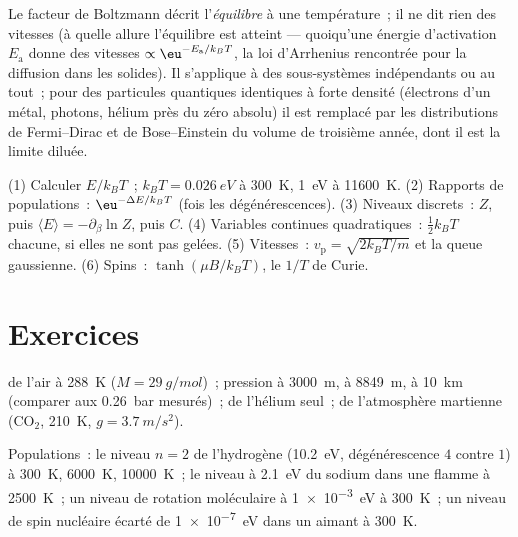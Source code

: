 \begin{remark}\label{rem:b2:boltzmann-factor:limits}
Le facteur de Boltzmann décrit l'\emph{équilibre} à une température~; il
ne dit rien des vitesses (à quelle allure l'équilibre est atteint ---
quoiqu'une énergie d'activation $E_{\text{a}}$ donne des vitesses $\propto\eu^{-E_{\text{a}}/k_BT}$,
la loi d'Arrhenius rencontrée pour la diffusion dans les solides). Il s'applique à des
sous-systèmes indépendants ou au tout~; pour des particules quantiques
identiques à forte densité (électrons d'un métal, photons, hélium près du
zéro absolu) il est remplacé par les distributions de Fermi--Dirac et de Bose--Einstein
du volume de troisième année, dont il est la limite diluée.
\end{remark}

\begin{method}\label{meth:b2:boltzmann-factor:method}
(1) Calculer $E/k_BT$~; $k_BT = \qty{0.026}{eV}$ à \qty{300}{K}, \qty{1}{eV}
à \qty{11600}{K}. (2) Rapports de populations~: $\eu^{-\Delta E/k_BT}$ (fois les
dégénérescences). (3) Niveaux discrets~: $Z$, puis $\langle E\rangle =
-\partial_\beta\ln Z$, puis $C$. (4) Variables continues quadratiques~:
$\tfrac12k_BT$ chacune, si elles ne sont pas gelées. (5) Vitesses~: $v_{\text{p}} = \sqrt{2k_BT/m}$
et la queue gaussienne. (6) Spins~: $\tanh(\mu B/k_BT)$, le $1/T$ de Curie.
\end{method}

\section{Exercices}

\begin{exercise}[$\star$]\label{exo:b2:boltzmann-factor:1}
 de l'air à \qty{288}{K} ($M = \qty{29}{g/mol}$)~; pression à
\qty{3000}{m}, à \qty{8849}{m}, à \qty{10}{km} (comparer aux \qty{0.26}{bar}
mesurés)~;  de l'hélium seul~; de l'atmosphère martienne
(CO$_2$, \qty{210}{K}, $g = \qty{3.7}{m/s^2}$).
\end{exercise}

\begin{exercise}[$\star$]\label{exo:b2:boltzmann-factor:2}
Populations~: le niveau $n = 2$ de l'hydrogène (\qty{10.2}{eV}, dégénérescence $4$
contre $1$) à \qty{300}{K}, \qty{6000}{K}, \qty{10000}{K}~; le niveau à
\qty{2.1}{eV} du sodium dans une flamme à \qty{2500}{K}~; un niveau de rotation moléculaire à
\qty{1e-3}{eV} à \qty{300}{K}~; un niveau de spin nucléaire écarté de \qty{1e-7}{eV} dans
un aimant à \qty{300}{K}.
\end{exercise}

